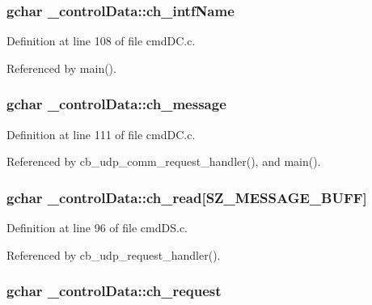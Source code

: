 \subsubsection[{ch\+\_\+intf\+Name}]{\setlength{\rightskip}{0pt plus 5cm}gchar \+\_\+control\+Data\+::ch\+\_\+intf\+Name}\label{struct__control_data_adac6cf5482e4bbabb442f8ab27e4bc62}


Definition at line 108 of file cmd\+D\+C.\+c.



Referenced by main().

\hypertarget{struct__control_data_a16162d5fe851704d7ea50ff16525b94c}{}
\subsubsection[{ch\+\_\+message}]{\setlength{\rightskip}{0pt plus 5cm}gchar \+\_\+control\+Data\+::ch\+\_\+message}\label{struct__control_data_a16162d5fe851704d7ea50ff16525b94c}


Definition at line 111 of file cmd\+D\+C.\+c.



Referenced by cb\+\_\+udp\+\_\+comm\+\_\+request\+\_\+handler(), and main().

\hypertarget{struct__control_data_a243b075becb92f2f37f56f60f738efb1}{}
\subsubsection[{ch\+\_\+read}]{\setlength{\rightskip}{0pt plus 5cm}gchar \+\_\+control\+Data\+::ch\+\_\+read\mbox{[}{\bf S\+Z\+\_\+\+M\+E\+S\+S\+A\+G\+E\+\_\+\+B\+U\+F\+F}\mbox{]}}\label{struct__control_data_a243b075becb92f2f37f56f60f738efb1}


Definition at line 96 of file cmd\+D\+S.\+c.



Referenced by cb\+\_\+udp\+\_\+request\+\_\+handler().

\hypertarget{struct__control_data_a948c37bbe26f5bdd4841b65384155edf}{}
\subsubsection[{ch\+\_\+request}]{\setlength{\rightskip}{0pt plus 5cm}gchar \+\_\+control\+Data\+::ch\+\_\+request}\label{struct__control_data_a948c37bbe26f5bdd4841b65384155edf}


